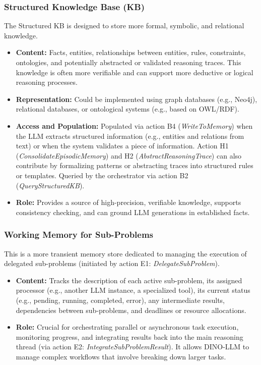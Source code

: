 \documentclass[11pt]{article}
\begin{document}
\subsubsection{Structured Knowledge Base (KB)}
\label{sssec:structured_kb}
The Structured KB is designed to store more formal, symbolic, and relational knowledge.
\begin{itemize}
    \item \textbf{Content:} Facts, entities, relationships between entities, rules, constraints, ontologies, and potentially abstracted or validated reasoning traces. This knowledge is often more verifiable and can support more deductive or logical reasoning processes.
    \item \textbf{Representation:} Could be implemented using graph databases (e.g., Neo4j), relational databases, or ontological systems (e.g., based on OWL/RDF).
    \item \textbf{Access and Population:} Populated via action B4 (\emph{WriteToMemory}) when the LLM extracts structured information (e.g., entities and relations from text) or when the system validates a piece of information. Action H1 (\emph{ConsolidateEpisodicMemory}) and H2 (\emph{AbstractReasoningTrace}) can also contribute by formalizing patterns or abstracting traces into structured rules or templates. Queried by the orchestrator via action B2 (\emph{QueryStructuredKB}).
    \item \textbf{Role:} Provides a source of high-precision, verifiable knowledge, supports consistency checking, and can ground LLM generations in established facts.
\end{itemize}

\subsubsection{Working Memory for Sub-Problems}
\label{sssec:working_memory_subproblems}
This is a more transient memory store dedicated to managing the execution of delegated sub-problems (initiated by action E1: \emph{DelegateSubProblem}).
\begin{itemize}
    \item \textbf{Content:} Tracks the description of each active sub-problem, its assigned processor (e.g., another LLM instance, a specialized tool), its current status (e.g., pending, running, completed, error), any intermediate results, dependencies between sub-problems, and deadlines or resource allocations.
    \item \textbf{Role:} Crucial for orchestrating parallel or asynchronous task execution, monitoring progress, and integrating results back into the main reasoning thread (via action E2: \emph{IntegrateSubProblemResult}). It allows DINO-LLM to manage complex workflows that involve breaking down larger tasks.
\end{itemize}
\end{document}
